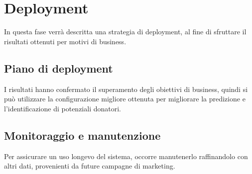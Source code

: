 \chapter{Deployment}
In questa fase verrà descritta una strategia di deployment, al fine di sfruttare il risultati ottenuti per motivi di business.

\section{Piano di deployment}
I risultati hanno confermato il superamento degli obiettivi di business, quindi si può utilizzare la configurazione migliore ottenuta per migliorare la predizione e l'identificazione di potenziali donatori.

\section{Monitoraggio e manutenzione}
Per assicurare un uso longevo del sistema, occorre manutenerlo raffinandolo con altri dati, provenienti da future campagne di marketing.